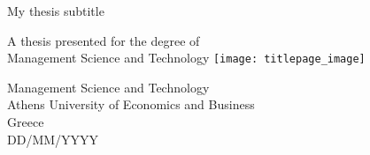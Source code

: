 \begin{titlepage}
    \begin{center}
        \vspace*{1cm}
 
        \Huge
        \vspace{0.5cm}
        \LARGE
        My thesis subtitle
 
        \vspace{1.5cm}
	\vspace{2.5cm}
 
        A thesis presented for the degree of\\
        Management Science and Technology
        \vspace{0.8cm}
	\texttt{[image: titlepage\_image]}
	\vfill

        \Large
        Management Science and Technology\\
        Athens University of Economics and Business\\
        Greece\\
        DD/MM/YYYY
	\vspace{2.5cm}
 
    \end{center}
\end{titlepage}